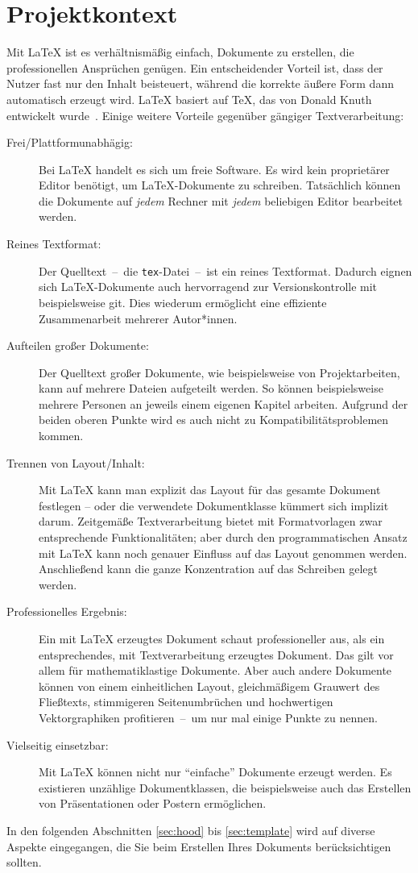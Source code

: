 \chapter{Projektkontext}
\label{chap:Textsatz}
%
Mit \LaTeX{} ist es verhältnismäßig einfach, Dokumente zu erstellen, die professionellen Ansprüchen genügen. Ein entscheidender Vorteil ist, dass der Nutzer fast nur den Inhalt beisteuert, während die korrekte äußere Form dann automatisch erzeugt wird. \LaTeX{} basiert auf \TeX{}, das von Donald Knuth entwickelt wurde~\cite{knuth:tex}. Einige weitere Vorteile gegenüber gängiger
Textverarbeitung:
\begin{description}
	\item[Frei/Plattformunabhägig:] Bei \LaTeX{} handelt es sich um freie 
	Software. Es wird kein proprietärer Editor benötigt, um \LaTeX{}-Dokumente
	zu schreiben. Tatsächlich können die Dokumente auf \emph{jedem} Rechner
	mit \emph{jedem} beliebigen Editor bearbeitet werden.
	\item[Reines Textformat:] Der Quelltext~--~die \texttt{tex}-Datei~--~ist
	ein reines Textformat. Dadurch eignen sich \LaTeX{}-Dokumente auch 
	hervorragend zur Versionskontrolle mit beispielsweise git. Dies wiederum
	ermöglicht eine effiziente Zusammenarbeit mehrerer Autor*innen.
	\item[Aufteilen großer Dokumente:] Der Quelltext großer Dokumente, wie 
	beispielsweise von Projektarbeiten, kann auf mehrere Dateien
	aufgeteilt werden. So können beispielsweise mehrere Personen an jeweils
	einem eigenen Kapitel arbeiten. Aufgrund der beiden oberen Punkte wird es 
	auch nicht zu Kompatibilitätsproblemen kommen.
	\item[Trennen von Layout/Inhalt:] Mit \LaTeX{} kann man explizit das
	Layout für das gesamte Dokument festlegen -- oder die verwendete 
	Dokumentklasse kümmert sich implizit darum. Zeitgemäße Textverarbeitung
	bietet mit Formatvorlagen zwar entsprechende Funktionalitäten; aber
	durch den programmatischen Ansatz mit \LaTeX{} kann noch genauer
	Einfluss auf das Layout genommen werden. Anschließend kann die ganze
	Konzentration auf das Schreiben gelegt werden.
	\item[Professionelles Ergebnis:] Ein mit \LaTeX{} erzeugtes Dokument
	schaut professioneller aus, als ein entsprechendes, mit Textverarbeitung
	erzeugtes Dokument. Das gilt vor allem für mathematiklastige Dokumente.
	Aber auch andere Dokumente können von einem einheitlichen 
	Layout, gleichmäßigem Grauwert des Fließtexts, stimmigeren Seitenumbrüchen 
	und hochwertigen Vektorgraphiken profitieren~--~um nur mal einige Punkte zu 
	nennen.
	\item[Vielseitig einsetzbar:] Mit \LaTeX{} können nicht nur 
	\enquote{einfache} Dokumente erzeugt werden. Es existieren unzählige
	Dokumentklassen, die beispielsweise auch das Erstellen von Präsentationen
	oder Postern ermöglichen.
\end{description}
\par
In den folgenden Abschnitten \ref{sec:hood} bis \ref{sec:template} wird auf diverse Aspekte eingegangen, die Sie beim Erstellen Ihres Dokuments berücksichtigen sollten.
%
%
